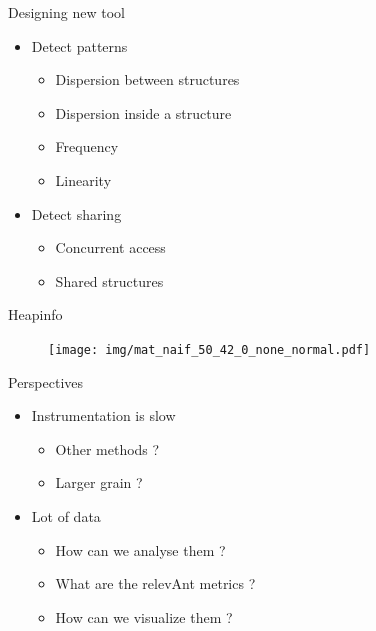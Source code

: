 \documentclass[xcolor={usenames,dvipsnames}]{beamer}
\begin{document}
\begin{frame}{Designing new tool}
    \begin{itemize}
        \item Detect patterns
            \begin{itemize}
                \item Dispersion between structures
                \item Dispersion inside a structure
                \item Frequency
                \item Linearity
            \end{itemize}
        \item Detect sharing
            \begin{itemize}
                \item Concurrent access
                \item Shared structures
            \end{itemize}
    \end{itemize}
\end{frame}
\begin{frame}{Heapinfo \cite{Beniamine13Cartographier}}
    \begin{figure}
        \centering
        \texttt{[image: img/mat\_naif\_50\_42\_0\_none\_normal.pdf]}
    \end{figure}
\end{frame}

\setcounter{finalframe}{\value{framenumber}}
\begin{frame}{Perspectives}
    \begin{itemize}
        \item Instrumentation is slow
            \begin{itemize}
                \item Other methods ?
                \item Larger grain ?
            \end{itemize}
        \item Lot of data
            \begin{itemize}
                \item How can we analyse them ?
                \item What are the relevAnt metrics ?
                \item How can we visualize them ? 
            \end{itemize}
    \end{itemize}
\end{frame}
\end{document}
